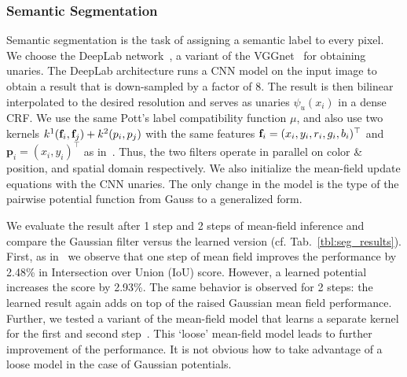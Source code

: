 \subsubsection{Semantic Segmentation}
Semantic segmentation is the task of assigning a semantic label
to every pixel. We choose the DeepLab network~\cite{chen2014semantic}, a
variant of the VGGnet~\cite{simonyan2014very} for obtaining unaries.
The DeepLab architecture runs a CNN
model on the input image to obtain a result that is down-sampled by a factor of
8. The result is then bilinear interpolated to the desired resolution and serves
as unaries $\psi_u(x_i)$ in a dense CRF. We use the same Pott's label
compatibility function $\mu$, and also use two kernels $k^1(\mathbf{f}_i,\mathbf{f}_j) +
k^2(p_i,p_j)$ with the same features $\mathbf{f}_i=(x_i,y_i,r_i,g_i,b_i)^{\top}$ and $\mathbf{p}_i=(x_i,y_i)^{\top}$
as in~\cite{chen2014semantic}. Thus, the two filters operate in parallel on
color \& position, and spatial domain respectively. We also initialize the
mean-field update equations with the CNN unaries. The only change in the model
is the type of the pairwise potential function from Gauss to a generalized form.

We evaluate the result after 1 step and 2 steps of mean-field inference and
compare the Gaussian filter versus the learned version (cf.
Tab.~\ref{tbl:seg_results}). First, as in~\cite{chen2014semantic} we observe
that one step of mean field improves the performance by 2.48\% in Intersection
over Union (IoU) score. However, a learned potential increases the score by
2.93\%. The same behavior is observed for 2 steps: the learned result again
adds on top of the raised Gaussian mean field performance. Further, we tested a
variant of the mean-field model that learns a separate kernel for the first and
second step~\cite{li2014mean}. This `loose' mean-field model
leads to further improvement of the performance. It is not obvious
how to take advantage
of a loose model in the case of Gaussian potentials.

